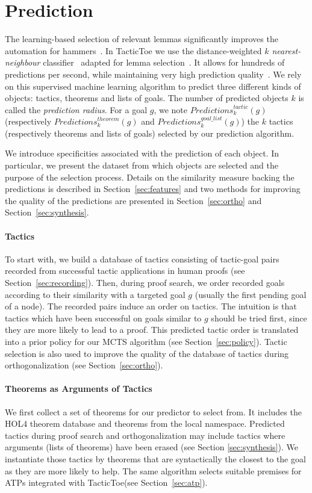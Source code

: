 \documentclass[runningheads,a4paper,draft]{svjour3}
\def\holfour{\textsf{HOL4}\xspace}
\def\tactictoe{\textsf{TacticToe}\xspace}
\begin{document}
\section{Prediction}\label{s:prediction}
The learning-based selection of relevant lemmas significantly improves the
automation for hammers~\cite{BlanchetteGKKU16}. In \tactictoe we use the
distance-weighted \emph{$k$ nearest-neighbour} classifier~\cite{DudaniS76}
adapted for lemma selection~\cite{ckju-pxtp13}. It allows for hundreds of
predictions per second, while maintaining very high prediction quality~\cite{femalecop}.
We rely on this supervised machine learning algorithm to predict three 
different kinds of objects:
 tactics, theorems and lists of goals. The number of predicted objects $k$ is
 called the \emph{prediction radius}. For a goal $g$, we note
$\mathit{Predictions}^{\mathit{tactic}}_k (g)$ (respectively
$\mathit{Predictions}^{\mathit{theorem}}_k (g)$
and $\mathit{Predictions}^{\mathit{goal\_list}}_k (g)$) the $k$ tactics 
(respectively theorems and lists of goals) selected by our prediction algorithm.

We introduce specificities associated with the prediction of each object.
In particular, we present the dataset from which objects are selected and the
purpose of the selection process. Details on the similarity measure backing the 
predictions is described in Section~\ref{sec:features} and two methods for 
improving the quality of the predictions are presented in 
Section~\ref{sec:ortho} and Section~\ref{sec:synthesis}.

\paragraph{Tactics}
To start with, we build a database of tactics consisting
of tactic-goal pairs recorded from successful tactic applications in human
proofs (see
Section~\ref{sec:recording}).
Then, during proof search, we order recorded goals according to their
similarity with a targeted goal $g$ (usually the first pending goal of a node).
The recorded pairs induce an
order on tactics. The intuition is that tactics which have been successful on
goals similar to $g$ should be tried first, since they are more likely to lead
to a proof.
This predicted tactic order is translated into a prior policy for our MCTS
algorithm (see Section~\ref{sec:policy}).
Tactic selection is also used to improve the quality of the database
of tactics during orthogonalization (see Section~\ref{sec:ortho}).

\paragraph{Theorems as Arguments of Tactics}
We first collect a set of theorems for our predictor to select from.
It includes the \holfour theorem database and theorems from the local namespace.
Predicted tactics during proof search and orthogonalization may include
tactics where arguments (lists of theorems) have been erased (see Section
\ref{sec:synthesis}).
We instantiate those tactics by theorems that are syntactically the closest to
the goal as they are more likely to help.
The same algorithm selects suitable premises for ATPs integrated with
\tactictoe (see Section~\ref{sec:atp}).
\end{document}
